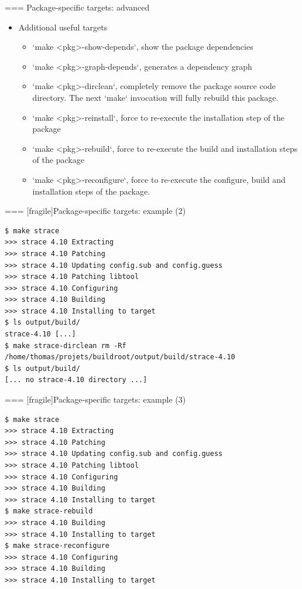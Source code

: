 === {Package-specific targets: advanced}
  \begin{itemize}
  \item Additional useful targets
    \begin{itemize}
    \item `make <pkg>-show-depends`, show the package dependencies
    \item `make <pkg>-graph-depends`, generates a dependency graph
    \item `make <pkg>-dirclean`, completely remove the package
      source code directory. The next `make` invocation will
      fully rebuild this package.
    \item `make <pkg>-reinstall`, force to re-execute the
      installation step of the package
    \item `make <pkg>-rebuild`, force to re-execute the build and
      installation steps of the package
    \item `make <pkg>-reconfigure`, force to re-execute the
      configure, build and installation steps of the package.
    \end{itemize}
  \end{itemize}


=== [fragile]{Package-specific targets: example (2)}

\begin{block}{}
{\tiny
\begin{verbatim}
$ make strace
>>> strace 4.10 Extracting
>>> strace 4.10 Patching
>>> strace 4.10 Updating config.sub and config.guess
>>> strace 4.10 Patching libtool
>>> strace 4.10 Configuring
>>> strace 4.10 Building
>>> strace 4.10 Installing to target
$ ls output/build/
strace-4.10 [...]
$ make strace-dirclean rm -Rf /home/thomas/projets/buildroot/output/build/strace-4.10
$ ls output/build/
[... no strace-4.10 directory ...]
\end{verbatim}}
\end{block}



=== [fragile]{Package-specific targets: example (3)}

\begin{block}{}
{\tiny
\begin{verbatim}
$ make strace
>>> strace 4.10 Extracting
>>> strace 4.10 Patching
>>> strace 4.10 Updating config.sub and config.guess
>>> strace 4.10 Patching libtool
>>> strace 4.10 Configuring
>>> strace 4.10 Building
>>> strace 4.10 Installing to target
$ make strace-rebuild
>>> strace 4.10 Building
>>> strace 4.10 Installing to target
$ make strace-reconfigure
>>> strace 4.10 Configuring
>>> strace 4.10 Building
>>> strace 4.10 Installing to target
\end{verbatim}}
\end{block}



